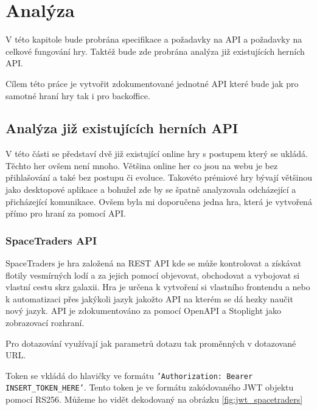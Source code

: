 \chapter{Analýza}
V této kapitole bude probrána specifikace a požadavky na API a požadavky na celkové fungování hry.
Taktéž bude zde probrána analýza již existujících herních API.

Cílem této práce je vytvořit zdokumentované jednotné API které bude jak pro samotné hraní hry tak i pro backoffice.
\section{Analýza již existujících herních API}
V této části se představí dvě již existující online hry s postupem který se ukládá. Těchto her ovšem není mnoho. Většina online her co jsou na webu je bez přihlašování a také bez postupu či evoluce. Takovéto prémiové hry bývají většinou jako desktopové aplikace a bohužel zde by se špatně analyzovala odcházející a přicházející komunikace.
Ovšem byla mi doporučena jedna hra, která je vytvořená přímo pro hraní za pomocí API.

\subsection{SpaceTraders API}\label{sub:SpaceTraders}
SpaceTraders je hra založená na REST API kde se může kontrolovat a získávat flotily vesmírných lodí a za jejich pomocí objevovat, obchodovat a vybojovat si vlastní cestu skrz galaxii. Hra je určena k vytvoření si vlastního frontendu a nebo k automatizaci přes jakýkoli jazyk jakožto API na kterém se dá hezky naučit nový jazyk. API je zdokumentováno za pomocí OpenAPI a Stoplight jako zobrazovací rozhraní. \cite[]{spacetraders}

Pro dotazování využívají jak parametrů dotazu tak proměnných v dotazované URL\@.

Token se vkládá do hlavičky ve formátu \texttt{'Authorization: Bearer INSERT\_TOKEN\_HERE'}. Tento token je ve formátu zakódovaného JWT  objektu pomocí RS256.
Můžeme ho vidět dekodovaný na obrázku \ref{fig:jwt_spacetraders}

